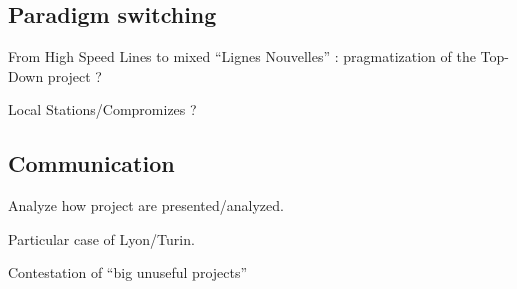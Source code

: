 \subsection{Paradigm switching}

From High Speed Lines to mixed ``Lignes Nouvelles'' : pragmatization of the Top-Down project ?

Local Stations/Compromizes ?

\subsection{Communication}

Analyze how project are presented/analyzed.

Particular case of Lyon/Turin.

Contestation of ``big unuseful projects''












